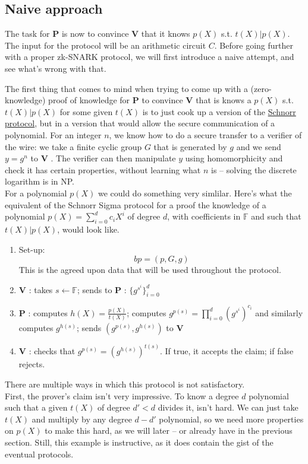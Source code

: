 \documentclass[11pt,oneside]{article}
\newcommand{\be}{\begin{equation}}
\newcommand{\ee}{\end{equation}}
\newcommand{\bP}{\textbf{P} }
\newcommand{\bV}{\textbf{V} }
\theoremstyle{definition}
\theoremstyle{remark}
\numberwithin{equation}{section}
\begin{document}
\subsection{Naive approach}\label{sec:circuits:protocol}

The task for \bP is now to convince \bV that it knows $p(X)$ s.t. $t(X)|p(X)$. The input for the protocol will be an arithmetic circuit $C$. Before going further with a proper zk-SNARK protocol, we will first introduce a naive attempt, and see what's wrong with that.

The first thing that comes to mind when trying to come up with a (zero-knowledge) proof of knowledge for \bP to convince \bV that is knows a $p(X)$ s.t. $t(X)|p(X)$ for some given $t(X)$ is to just cook up a version of the \hyperlink{box:schnorr}{Schnorr protocol}, but in a version that would allow the secure communication of a polynomial. For an integer $n$, we know how to do a secure transfer to a verifier of the wire: we take a finite cyclic group $G$ that is generated by $g$ and we send $y=g^n$ to \bV. The verifier can then manipulate $y$ using homomorphicity and check it has certain properties, without learning what $n$ is -- solving the discrete logarithm is in NP.\\
For a polynomial $p(X)$ we could do something very simlilar. Here's what the equivalent of the Schnorr Sigma protocol for a proof the knowledge of a polynomial $p(X)=\sum_{i=0}^{d}c_iX^i$ of degree $d$, with coefficients in $\mathbb{F}$ and such that $t(X)|p(X)$, would look like.
\begin{enumerate}
	\item Set-up: \be bp = (p,G,g) \ee
	This is the agreed upon data that will be used throughout the protocol.
	\item \bV: takes $s\leftarrow\mathbb{F}$; sends to \bP: $\{g^{s^i}\}_{i=0}^{d}$
	\item \bP: computes $h(X)=\frac{p(X)}{t(X)}$; computes $g^{p(s)}=\prod\limits_{i=0}^d\left(g^{s^i}\right)^{c_i}$ and similarly computes $g^{h(s)}$; sends $(g^{p(s)},g^{h(s)})$ to \bV
	\item \bV: checks that $g^{p(s)}=\left(g^{h(s)}\right)^{t(s)}$. If true, it accepts the claim; if false rejects.
	\end{enumerate}
There are multiple ways in which this protocol is not satisfactory.\\ 
First, the prover's claim isn't very impressive. To know a degree $d$ polynomial such that a given $t(X)$ of degree $d'<d$ divides it, isn't hard. We can just take $t(X)$ and multiply by any degree $d-d'$ polynomial, so we need more properties on $p(X)$ to make this hard, as we will later -- or already have in the previous section. Still, this example is instructive, as it does contain the gist of the eventual protocols.\\ 
\end{document}
